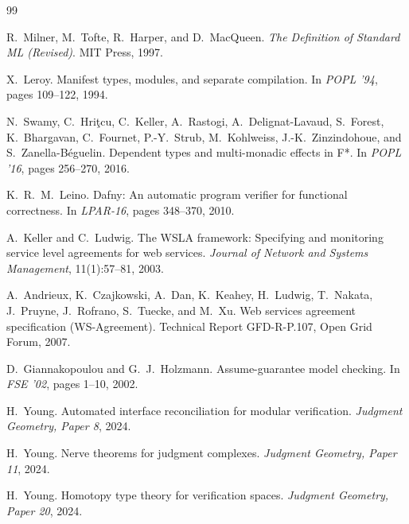 \documentclass[11pt]{article}
\begin{document}
\begin{thebibliography}{99}

R.~Milner, M.~Tofte, R.~Harper, and D.~MacQueen.
\newblock \emph{The Definition of Standard ML (Revised)}.
\newblock MIT Press, 1997.

X.~Leroy.
\newblock Manifest types, modules, and separate compilation.
\newblock In \emph{POPL '94}, pages 109--122, 1994.

N.~Swamy, C.~Hri{\c{t}}cu, C.~Keller, A.~Rastogi, A.~Delignat-Lavaud,
  S.~Forest, K.~Bhargavan, C.~Fournet, P.-Y.~Strub, M.~Kohlweiss,
  J.-K.~Zinzindohoue, and S.~Zanella-B{\'e}guelin.
\newblock Dependent types and multi-monadic effects in {F*}.
\newblock In \emph{POPL '16}, pages 256--270, 2016.

K.~R.~M.~Leino.
\newblock Dafny: An automatic program verifier for functional correctness.
\newblock In \emph{LPAR-16}, pages 348--370, 2010.

A.~Keller and C.~Ludwig.
\newblock The {WSLA} framework: Specifying and monitoring service level
  agreements for web services.
\newblock \emph{Journal of Network and Systems Management}, 11(1):57--81, 2003.

A.~Andrieux, K.~Czajkowski, A.~Dan, K.~Keahey, H.~Ludwig, T.~Nakata,
  J.~Pruyne, J.~Rofrano, S.~Tuecke, and M.~Xu.
\newblock Web services agreement specification ({WS-Agreement}).
\newblock Technical Report GFD-R-P.107, Open Grid Forum, 2007.

D.~Giannakopoulou and G.~J.~Holzmann.
\newblock Assume-guarantee model checking.
\newblock In \emph{FSE '02}, pages 1--10, 2002.

H.~Young.
\newblock Automated interface reconciliation for modular verification.
\newblock \emph{Judgment Geometry, Paper 8}, 2024.

H.~Young.
\newblock Nerve theorems for judgment complexes.
\newblock \emph{Judgment Geometry, Paper 11}, 2024.

H.~Young.
\newblock Homotopy type theory for verification spaces.
\newblock \emph{Judgment Geometry, Paper 20}, 2024.

\end{thebibliography}
\end{document}
